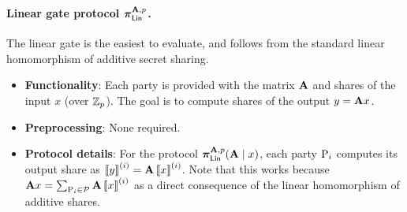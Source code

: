 \begin{table}[t!]
\caption{Summary of input, output, and randomness for the circuit gate protocols. }
\label{table:gate_protocol_summary}
\end{table}


\paragraph{Linear gate protocol $\prot_\LMap^{\mat{A}, p}$.}
The linear gate is the easiest to evaluate, and follows from the standard linear homomorphism of additive secret sharing.

\begin{itemize}
  \item \textbf{Functionality}: Each party is provided with the matrix $\mat{A}$ and shares of the input $x$ (over $\mathbb{Z}_p$). The goal is to compute shares of the output $y = \mat{A}x$.

  \item \textbf{Preprocessing}: None required.

  \item \textbf{Protocol details}:
  For the protocol $\prot_\LMap^{\mat{A}, p}(\mat{A} \mid x)$, each party $\textnormal{P}_i$ computes its output share as $\sharei{y} = \mat{A}\sharei{x}$. Note that this works because $\mat{A}x = \sum_{\party_i \in \parties} \mat{A}\sharei{x}$ as a direct consequence of the linear homomorphism of additive shares.
\end{itemize}

